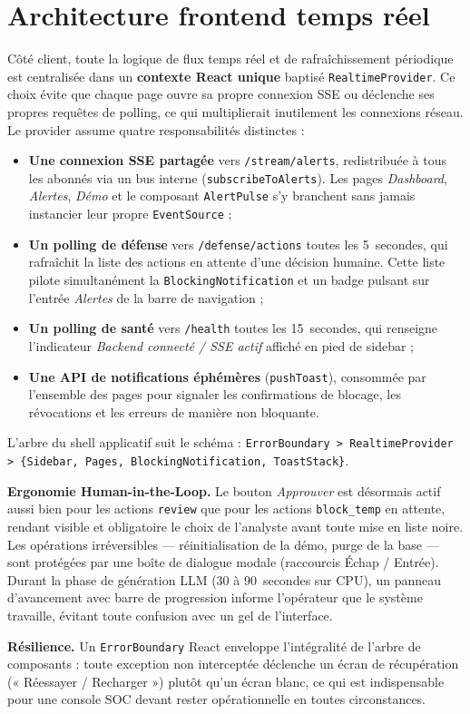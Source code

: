 \documentclass[12pt,a4paper]{report}
\begin{document}
\section{Architecture frontend temps réel}
\begin{onehalfspace}
Côté client, toute la logique de flux temps réel et de rafraîchissement
périodique est centralisée dans un \textbf{contexte React unique} baptisé
\texttt{RealtimeProvider}. Ce choix évite que chaque page ouvre sa propre
connexion SSE ou déclenche ses propres requêtes de polling, ce qui
multiplierait inutilement les connexions réseau. Le provider assume
quatre responsabilités distinctes :

\begin{itemize}
  \item[\ding{43}] \textbf{Une connexion SSE partagée} vers \texttt{/stream/alerts},
  redistribuée à tous les abonnés via un bus interne
  (\texttt{subscribeToAlerts}). Les pages \textit{Dashboard}, \textit{Alertes},
  \textit{Démo} et le composant \texttt{AlertPulse} s'y branchent sans
  jamais instancier leur propre \texttt{EventSource} ;
  \item[\ding{43}] \textbf{Un polling de défense} vers \texttt{/defense/actions}
  toutes les 5~secondes, qui rafraîchit la liste des actions en attente
  d'une décision humaine. Cette liste pilote simultanément la
  \texttt{BlockingNotification} et un badge pulsant sur l'entrée
  \textit{Alertes} de la barre de navigation ;
  \item[\ding{43}] \textbf{Un polling de santé} vers \texttt{/health}
  toutes les 15~secondes, qui renseigne l'indicateur
  \textit{Backend connecté / SSE actif} affiché en pied de sidebar ;
  \item[\ding{43}] \textbf{Une API de notifications éphémères}
  (\texttt{pushToast}), consommée par l'ensemble des pages pour signaler
  les confirmations de blocage, les révocations et les erreurs de manière
  non bloquante.
\end{itemize}

L'arbre du shell applicatif suit le schéma :
\texttt{ErrorBoundary > RealtimeProvider > \{Sidebar, Pages,
BlockingNotification, ToastStack\}}.

\textbf{Ergonomie Human-in-the-Loop.} Le bouton \textit{Approuver} est
désormais actif aussi bien pour les actions \texttt{review} que pour les
actions \texttt{block\_temp} en attente, rendant visible et obligatoire le
choix de l'analyste avant toute mise en liste noire. Les opérations
irréversibles — réinitialisation de la démo, purge de la base — sont
protégées par une boîte de dialogue modale (raccourcis Échap / Entrée).
Durant la phase de génération LLM (30 à 90~secondes sur CPU), un panneau
d'avancement avec barre de progression informe l'opérateur que le système
travaille, évitant toute confusion avec un gel de l'interface.

\textbf{Résilience.} Un \texttt{ErrorBoundary} React enveloppe l'intégralité
de l'arbre de composants : toute exception non interceptée déclenche un
écran de récupération (« Réessayer / Recharger ») plutôt qu'un écran blanc,
ce qui est indispensable pour une console SOC devant rester opérationnelle
en toutes circonstances.
\end{onehalfspace}
\end{document}
